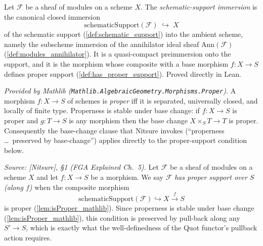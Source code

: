 \begin{definition}
  \label{def:schematic_support_immersion}
  Let \(\mathcal{F}\) be a sheaf of modules on a scheme \(X\). The
  \emph{schematic-support immersion} is the canonical closed immersion
  \[
    \mathrm{schematicSupport}(\mathcal{F}) \;\hookrightarrow\; X
  \]
  of the schematic support (\cref{def:schematic_support}) into the ambient
  scheme, namely the subscheme immersion of the annihilator ideal sheaf
  \(\mathrm{Ann}(\mathcal{F})\) (\cref{def:modules_annihilator}). It is a
  quasi-compact preimmersion onto the support, and it is the morphism whose
  composite with a base morphism \(f : X \to S\) defines proper support
  (\cref{def:has_proper_support}). Proved directly in Lean.
\end{definition}

\begin{lemma}
  \label{lem:isProper_mathlib}
  \mathlibok
  \textit{Provided by Mathlib
  (\texttt{Mathlib.AlgebraicGeometry.Morphisms.Proper}).}
  A morphism \(f : X \to S\) of schemes is \emph{proper} iff it is separated,
  universally closed, and locally of finite type. Properness is stable under base
  change: if \(f : X \to S\) is proper and \(g : T \to S\) is any morphism then
  the base change \(X \times_S T \to T\) is proper. Consequently the base-change
  clause that Nitsure invokes (``properness \ldots\ preserved by base-change'')
  applies directly to the proper-support condition below.
\end{lemma}

\begin{definition}

  \label{def:has_proper_support}
  \textit{Source: [Nitsure], \S 1 (FGA Explained Ch.~5).}
  Let \(\mathcal{F}\) be a sheaf of modules on a scheme \(X\) and let
  \(f : X \to S\) be a morphism. We say \(\mathcal{F}\) \emph{has proper support
  over \(S\) (along \(f\))} when the composite morphism
  \[
    \mathrm{schematicSupport}(\mathcal{F}) \hookrightarrow X \xrightarrow{f} S
  \]
  is proper (\cref{lem:isProper_mathlib}). Since properness is stable under base
  change (\cref{lem:isProper_mathlib}), this condition is preserved by pull-back
  along any \(S'\to S\), which is exactly what the well-definedness of the Quot
  functor's pullback action requires.
\end{definition}

